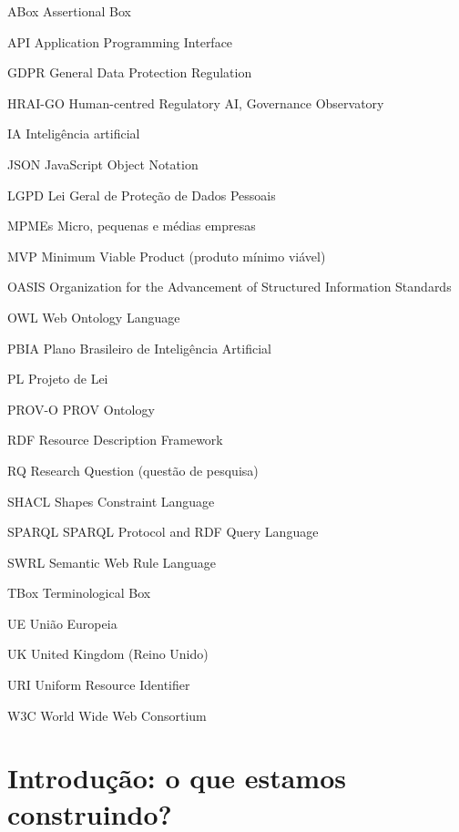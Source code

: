 \documentclass[12pt,a4paper,oneside,english,brazil]{abntex2}
\begin{document}
\begin{siglas}
  \item[ABox] Assertional Box
  \item[API] Application Programming Interface
  \item[GDPR] General Data Protection Regulation
  \item[HRAI-GO] Human-centred Regulatory AI, Governance Observatory
  \item[IA] Inteligência artificial
  \item[JSON] JavaScript Object Notation
  \item[LGPD] Lei Geral de Proteção de Dados Pessoais
  \item[MPMEs] Micro, pequenas e médias empresas
  \item[MVP] Minimum Viable Product (produto mínimo viável)
  \item[OASIS] Organization for the Advancement of Structured Information Standards
  \item[OWL] Web Ontology Language
  \item[PBIA] Plano Brasileiro de Inteligência Artificial
  \item[PL] Projeto de Lei
  \item[PROV-O] PROV Ontology
  \item[RDF] Resource Description Framework
  \item[RQ] Research Question (questão de pesquisa)
  \item[SHACL] Shapes Constraint Language
  \item[SPARQL] SPARQL Protocol and RDF Query Language
  \item[SWRL] Semantic Web Rule Language
  \item[TBox] Terminological Box
  \item[UE] União Europeia
  \item[UK] United Kingdom (Reino Unido)
  \item[URI] Uniform Resource Identifier
  \item[W3C] World Wide Web Consortium
\end{siglas}

\tableofcontents*
\cleardoublepage

\textual

\chapter{Introdução: o que estamos construindo?}
\end{document}
